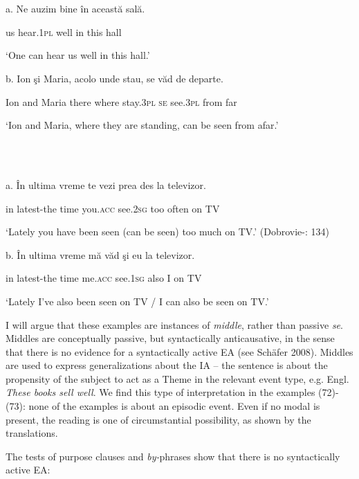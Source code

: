 \documentclass[output=paper]{langsci/langscibook}
\begin{document}
\ea%
    \label{ex:key:72}
    \gll\\
        \\
    \glt
    \z

          a.   Ne auzim    bine în această sală.    

      us  hear.1\textsc{pl} well in this      hall

      ‘One can hear us well in this hall.’

b.   Ion şi   Maria,  acolo  unde  stau,      se văd       de     departe.

      Ion and Maria  there where stay.3\textsc{pl se} see.\textsc{3pl} from far

      ‘Ion and Maria, where they are standing, can be seen from afar.’

\ea%
    \label{ex:key:73}
    \gll\\
        \\
    \glt
    \z

          a.   În ultima     vreme te            vezi       prea des     la   televizor. 

           in latest-the time   you.\textsc{acc}  see.\textsc{2sg} too    often on TV

‘Lately you have been seen (can be seen) too much on TV.’ (Dobrovie-\citealt{Sorin2017}: 134)

b.   În ultima     vreme  mă        văd       şi     eu  la   televizor.

          in latest-the time     me.\textsc{acc} see.\textsc{1sg} also I    on TV

       ‘Lately I’ve also been seen on TV / I can also be seen on TV.’

I will argue that these examples are instances of \textit{middle}, rather than passive \textit{se}. Middles are conceptually passive, but syntactically anticausative, in the sense that there is no evidence for a syntactically active EA (see Schäfer 2008). Middles are used to express generalizations about the IA – the sentence is about the propensity of the subject to act as a Theme in the relevant event type, e.g. Engl. \textit{These books sell well}. We find this type of interpretation in the examples (72)-(73): none of the examples is about an episodic event. Even if no modal is present, the reading is one of circumstantial possibility, as shown by the translations. 

  The tests of purpose clauses and \textit{by-}phrases show that there is no syntactically active EA: 

\ea%
    \label{ex:key:74}
    \gll\\
        \\
    \glt
    \z
\end{document}

